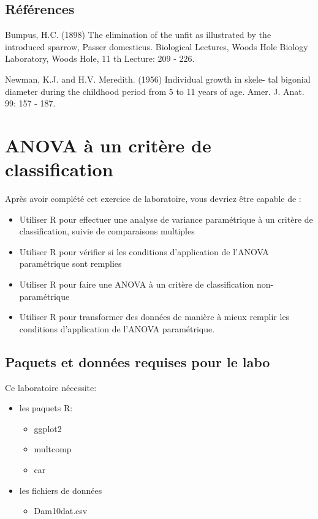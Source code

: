 \documentclass[
  12pt,
]{book}
\providecommand{\tightlist}{%
  \setlength{\itemsep}{0pt}\setlength{\parskip}{0pt}}
\begin{document}
\hypertarget{ruxe9fuxe9rences}{%
\section{Références}\label{ruxe9fuxe9rences}}

Bumpus, H.C. (1898) The elimination of the unfit as illustrated by the introduced sparrow, Passer domesticus. Biological Lectures, Woods Hole Biology Laboratory, Woods Hole, 11 th Lecture: 209 - 226.

Newman, K.J. and H.V. Meredith. (1956) Individual growth in skele- tal bigonial diameter during the childhood period from 5 to 11 years of age. Amer. J. Anat. 99: 157 - 187.

\hypertarget{anova-uxe0-un-crituxe8re-de-classification}{%
\chapter{ANOVA à un critère de classification}\label{anova-uxe0-un-crituxe8re-de-classification}}

Après avoir complété cet exercice de laboratoire, vous devriez être capable de :

\begin{itemize}
\tightlist
\item
  Utiliser R pour effectuer une analyse de variance paramétrique à un critère de classification, suivie de comparaisons multiples
\item
  Utiliser R pour vérifier si les conditions d'application de l'ANOVA paramétrique sont remplies
\item
  Utiliser R pour faire une ANOVA à un critère de classification non-paramétrique
\item
  Utiliser R pour transformer des données de manière à mieux remplir les conditions d'application de l'ANOVA paramétrique.
\end{itemize}

\hypertarget{set-ano}{%
\section{Paquets et données requises pour le labo}\label{set-ano}}

Ce laboratoire nécessite:

\begin{itemize}
\tightlist
\item
  les paquets R:

  \begin{itemize}
  \tightlist
  \item
    ggplot2
  \item
    multcomp
  \item
    car
  \end{itemize}
\item
  les fichiers de données

  \begin{itemize}
  \tightlist
  \item
    Dam10dat.csv
  \end{itemize}
\end{itemize}
\end{document}

